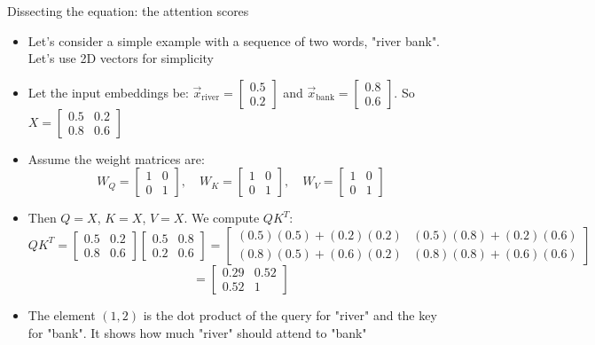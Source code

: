 \documentclass[aspectratio=169]{beamer}\usepackage[]{graphicx}\usepackage[]{xcolor}
\begin{document}
\begin{frame}{Dissecting the equation: the attention scores}
\begin{itemize}
\item Let's consider a simple example with a sequence of two words, "river bank". Let's use 2D vectors for simplicity
\vfill
\item Let the input embeddings be: $\vec{x}_{\text{river}} = \begin{bmatrix} 0.5 \\ 0.2 \end{bmatrix}$ and $\vec{x}_{\text{bank}} = \begin{bmatrix} 0.8 \\ 0.6 \end{bmatrix}$. So $X = \begin{bmatrix} 0.5 & 0.2 \\ 0.8 & 0.6 \end{bmatrix}$
\vfill
\item Assume the weight matrices are:
  $$ W_Q = \begin{bmatrix} 1 & 0 \\ 0 & 1 \end{bmatrix}, \quad W_K = \begin{bmatrix} 1 & 0 \\ 0 & 1 \end{bmatrix}, \quad W_V = \begin{bmatrix} 1 & 0 \\ 0 & 1 \end{bmatrix} $$
\vfill
\item Then $Q=X$, $K=X$, $V=X$. We compute $QK^T$:
  $$ QK^T = \begin{bmatrix} 0.5 & 0.2 \\ 0.8 & 0.6 \end{bmatrix} \begin{bmatrix} 0.5 & 0.8 \\ 0.2 & 0.6 \end{bmatrix} = \begin{bmatrix} (0.5)(0.5) + (0.2)(0.2) & (0.5)(0.8) + (0.2)(0.6) \\ (0.8)(0.5) + (0.6)(0.2) & (0.8)(0.8) + (0.6)(0.6) \end{bmatrix} $$
  $$ = \begin{bmatrix} 0.29 & 0.52 \\ 0.52 & 1 \end{bmatrix} $$
\vfill
\item The element $(1,2)$ is the dot product of the query for "river" and the key for "bank". It shows how much "river" should attend to "bank"
\end{itemize}
\end{frame}
\end{document}
